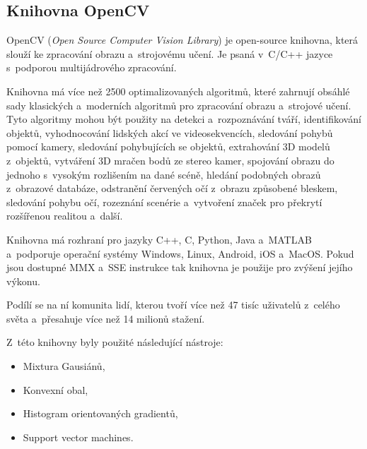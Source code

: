 \subsection{Knihovna OpenCV}
OpenCV (\textit{Open Source Computer Vision Library}) je open-source knihovna, která slouží ke zpracování obrazu a~strojovému učení. Je psaná v~C/C++ jazyce s~podporou multijádrového zpracování.

Knihovna má více než 2500 optimalizovaných algoritmů, které zahrnují obsáhlé sady klasických a~moderních algoritmů pro zpracování obrazu a~strojové učení. Tyto algoritmy mohou být použity na detekci a~rozpoznávání tváří, identifikování objektů, vyhodnocování lidských akcí ve videosekvencích, sledování pohybů pomocí kamery, sledování pohybujících se objektů, extrahování 3D modelů z~objektů, vytváření 3D mračen bodů ze stereo kamer, spojování obrazu do jednoho s~vysokým rozlišením na dané scéně, hledání podobných obrazů z~obrazové databáze, odstranění červených očí z~obrazu způsobené bleskem, sledování pohybu očí, rozeznání scenérie a~vytvoření značek pro překrytí rozšířenou realitou a~další.

Knihovna má rozhraní pro jazyky C++, C, Python, Java a~MATLAB a~podporuje operační systémy Windows, Linux, Android, iOS a~MacOS. 
Pokud jsou dostupné MMX a~SSE instrukce tak knihovna je použije pro zvýšení jejího výkonu.

Podílí se na ní komunita lidí, kterou tvoří více než 47 tisíc uživatelů z~celého světa a~přesahuje více než 14 milionů stažení. 



Z~této knihovny byly použité následující nástroje:

\begin{itemize}
  \item{Mixtura Gausiánů,}
  \item{Konvexní obal,}
  \item{Histogram orientovaných gradientů,}
  \item{Support vector machines.}
\end{itemize}